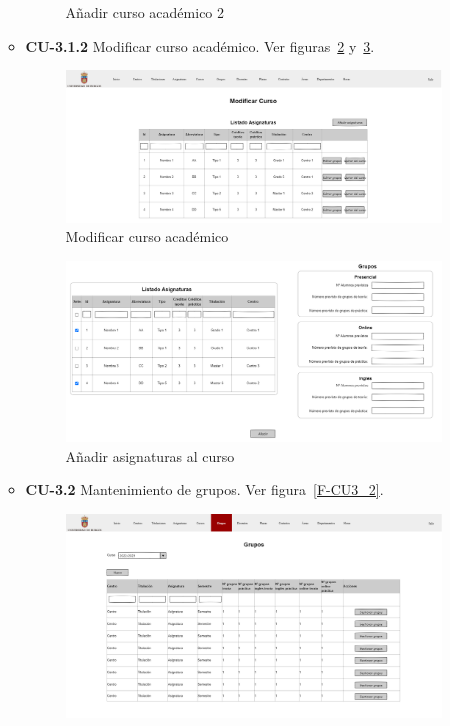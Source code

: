 \begin{itemize}
\begin{itemize}
\begin{figure}[!h]
		\caption{Añadir curso académico 2}\label{F-CU3_1_1(1)}
		\end{figure}
		\FloatBarrier
\newpage
		\item \textbf{CU-3.1.2} Modificar curso académico. Ver figuras~\ref{F-CU3_1_2} y~\ref{F-CU3_1_2(1)}.
		\begin{figure}[!h]
		\centering
		\includegraphics[width=\textwidth]{../img/Anexos/Vistas/mod_curso.png}
		\caption{Modificar curso académico}\label{F-CU3_1_2}
		\end{figure}
		\FloatBarrier
		\begin{figure}[!h]
		\centering
		\includegraphics[width=\textwidth]{../img/Anexos/Vistas/add_asig.png}
		\caption{Añadir asignaturas al curso}\label{F-CU3_1_2(1)}
		\end{figure}
		\FloatBarrier
\newpage
		\item \textbf{CU-3.2} Mantenimiento de grupos. Ver figura~\ref{F-CU3_2}.
		\begin{figure}[!h]
		\centering
		\includegraphics[width=\textwidth]{../img/Anexos/Vistas/grupos.png}

\end{figure}
\end{itemize}
\end{itemize}
